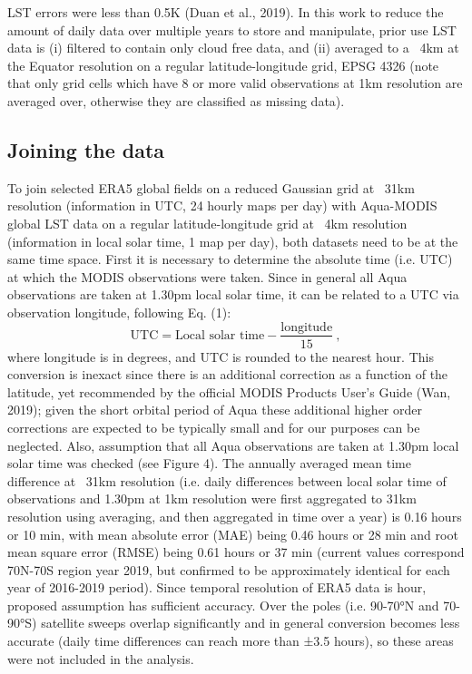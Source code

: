 \documentclass[hess, manuscript]{copernicus}
\begin{document}
LST errors were less than 0.5K (Duan et al., 2019). In this work to reduce the amount of daily data over multiple years to store and manipulate, prior use LST data is (i) filtered to contain only cloud free data, and (ii) averaged to a ~4km at the Equator resolution on a regular latitude-longitude grid, EPSG 4326 (note that only grid cells which have 8 or more valid observations at 1km resolution are averaged over, otherwise they are classified as missing data).




%


\subsection{Joining the data}\label{sec:join}
To join selected ERA5 global fields on a reduced Gaussian grid at ~31km resolution (information in UTC, 24 hourly maps per day) with Aqua-MODIS global LST data on a regular latitude-longitude grid at ~4km resolution (information in local solar time, 1 map per day), both datasets need to be at the same time space. First it is necessary to determine the absolute time (i.e. UTC) at which the MODIS observations were taken. Since in general all Aqua observations are taken at 1.30pm local solar time, it can be related to a UTC via observation longitude, following Eq. (1):
\begin{equation}
	\text{UTC} = \text{Local solar time} - \frac{\text{longitude}}{15} \ , 
\end{equation}
where longitude is in degrees, and UTC is rounded to the nearest hour. This conversion is inexact since there is an additional correction as a function of the latitude, yet recommended by the official MODIS Products User’s Guide (Wan, 2019); given the short orbital period of Aqua these additional higher order corrections are expected to be typically small and for our purposes can be neglected. Also, assumption that all Aqua observations are taken at 1.30pm local solar time was checked (see Figure 4). The annually averaged mean time difference at ~31km resolution (i.e. daily differences between local solar time of observations and 1.30pm at 1km resolution were first aggregated to 31km resolution using averaging, and then aggregated in time over a year) is 0.16 hours or 10 min, with mean absolute error (MAE) being 0.46 hours or 28 min and root mean square error (RMSE) being 0.61 hours or 37 min (current values correspond 70N-70S region year 2019, but confirmed to be approximately identical for each year of 2016-2019 period). Since temporal resolution of ERA5 data is hour, proposed assumption has sufficient accuracy. Over the poles (i.e. 90-70°N and 70-90°S) satellite sweeps overlap significantly and in general conversion becomes less accurate (daily time differences can reach more than ±3.5 hours), so these areas were not included in the analysis. 
\end{document}
